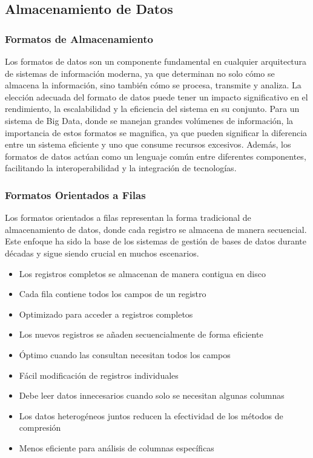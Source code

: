 \subsection{Almacenamiento de Datos}

\subsubsection {Formatos de Almacenamiento}

Los formatos de datos son un componente fundamental en cualquier arquitectura de sistemas de información moderna, 
ya que determinan no solo cómo se almacena la información, sino también cómo se procesa, transmite y analiza. 
La elección adecuada del formato de datos puede tener un impacto significativo en el rendimiento, 
la escalabilidad y la eficiencia del sistema en su conjunto. Para un sistema de Big Data, 
donde se manejan grandes volúmenes de información, la importancia de estos formatos se magnifica, 
ya que pueden significar la diferencia entre un sistema eficiente y uno que consume recursos excesivos. 
Además, los formatos de datos actúan como un lenguaje común entre diferentes componentes, 
facilitando la interoperabilidad y la integración de tecnologías.

\subsubsection{Formatos Orientados a Filas}
Los formatos orientados a filas representan la forma tradicional de almacenamiento de datos, 
donde cada registro se almacena de manera secuencial. Este enfoque ha sido la base de los sistemas 
de gestión de bases de datos durante décadas y sigue siendo crucial en muchos escenarios.

\begin{itemize}
    \item Los registros completos se almacenan de manera contigua en disco
    \item Cada fila contiene todos los campos de un registro
    \item Optimizado para acceder a registros completos
    \item Los nuevos registros se añaden secuencialmente de forma eficiente
    \item Óptimo cuando las consultan necesitan todos los campos
    \item Fácil modificación de registros individuales
    \item Debe leer datos innecesarios cuando solo se necesitan algunas columnas
    \item Los datos heterogéneos juntos reducen la efectividad de los métodos de compresión
    \item Menos eficiente para análisis de columnas específicas
\end{itemize}


